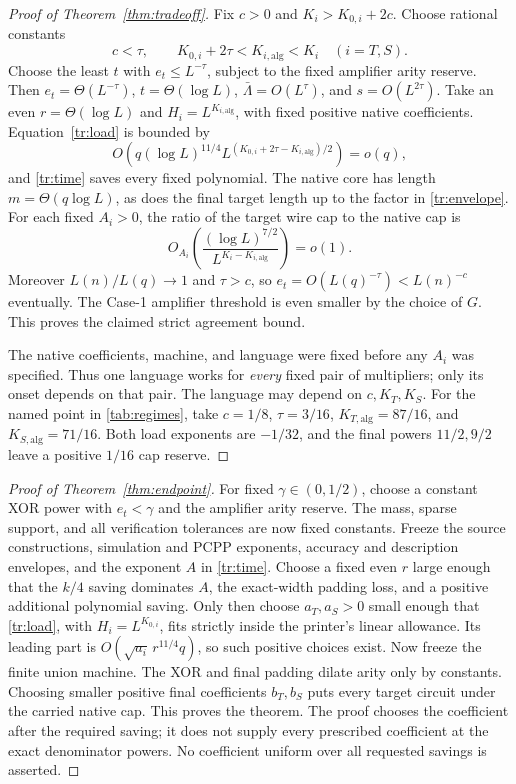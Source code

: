 \documentclass[11pt,letterpaper]{article}
\theoremstyle{definition}
\theoremstyle{remark}
\begin{document}
\begin{proof}[Proof of Theorem~\ref{thm:tradeoff}]
Fix $c>0$ and $K_i>K_{0,i}+2c$. Choose rational constants
\[
 c<\tau,\qquad K_{0,i}+2\tau<K_{i,\mathrm{alg}}<K_i
 \quad(i=T,S).
\]
Choose the least $t$ with $e_t\le L^{-\tau}$, subject to the fixed
amplifier arity reserve. Then
$e_t=\Theta(L^{-\tau})$, $t=\Theta(\log L)$,
$\bar\Lambda=O(L^\tau)$, and $s=O(L^{2\tau})$.
Take an even $r=\Theta(\log L)$ and
$H_i=L^{K_{i,\mathrm{alg}}}$, with fixed positive native coefficients.
Equation~\eqref{tr:load} is bounded by
\[
 O\left(q(\log L)^{11/4}
 L^{(K_{0,i}+2\tau-K_{i,\mathrm{alg}})/2}\right)=o(q),
\]
and \eqref{tr:time} saves every fixed polynomial.
The native core has length $m=\Theta(q\log L)$, as does the final
target length up to the factor in \eqref{tr:envelope}.
For each fixed $A_i>0$, the ratio of the target wire cap to the
native cap is
\[
 O_{A_i}\left(
 \frac{(\log L)^{7/2}}{L^{K_i-K_{i,\mathrm{alg}}}}\right)=o(1).
\]
Moreover $L(n)/L(q)\to1$ and $\tau>c$, so
$e_t=O(L(q)^{-\tau})<L(n)^{-c}$ eventually. The Case-1 amplifier
threshold is even smaller by the choice of $G$.
This proves the claimed strict agreement bound.

The native coefficients, machine, and language were fixed before any
$A_i$ was specified. Thus one language works for \emph{every} fixed
pair of multipliers; only its onset depends on that pair.
The language may depend on $c,K_T,K_S$.
For the named point in \cref{tab:regimes}, take
$c=1/8$, $\tau=3/16$,
$K_{T,\mathrm{alg}}=87/16$, and $K_{S,\mathrm{alg}}=71/16$.
Both load exponents are $-1/32$, and the final powers $11/2,9/2$
leave a positive $1/16$ cap reserve.
\end{proof}

\begin{proof}[Proof of Theorem~\ref{thm:endpoint}]
For fixed $\gamma\in(0,1/2)$, choose a constant XOR power with
$e_t<\gamma$ and the amplifier arity reserve. The mass, sparse
support, and all verification tolerances are now fixed constants.
Freeze the source constructions, simulation and PCPP exponents,
accuracy and description envelopes, and the exponent $A$ in
\eqref{tr:time}. Choose a fixed even $r$ large enough that the
$k/4$ saving dominates $A$, the exact-width padding loss, and a
positive additional polynomial saving. Only then choose $a_T,a_S>0$
small enough that \eqref{tr:load}, with $H_i=L^{K_{0,i}}$, fits
strictly inside the printer's linear allowance. Its leading part is
$O(\sqrt{a_i}\,r^{11/4}q)$, so such positive choices exist.
Now freeze the finite union machine.
The XOR and final padding dilate arity only by constants. Choosing
smaller positive final coefficients $b_T,b_S$ puts every target
circuit under the carried native cap. This proves the theorem.
The proof chooses the coefficient after the required saving; it does
not supply every prescribed coefficient at the exact denominator
powers. No coefficient uniform over all requested savings is asserted.
\end{proof}
\end{document}
